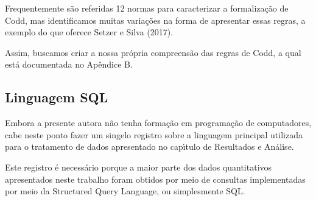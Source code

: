 \documentclass[
12pt,		%
openright,	%
twoside,  %
a4paper,			%
chapter=TITLE,		%
english,			%
french,				%
spanish,			%
brazil				%
]{USPSC-classe/USPSC}
\begin{document}
Frequentemente s\~ao referidas 12 normas para caracterizar a formaliza\c{c}\~ao de Codd, mas identificamos muitas varia\c{c}\~oes na forma de apresentar essas regras, a exemplo do que oferece Setzer e Silva (2017).

















Assim, buscamos criar a nossa pr\'opria compreens\~ao das regras de Codd, a qual est\'a documentada no Ap\^endice B.

















\subsection[Linguagem SQL]{Linguagem SQL}\label{Linguagem SQL}
Embora a presente autora n\~ao tenha forma\c{c}\~ao em programa\c{c}\~ao de computadores, cabe neste ponto fazer um singelo registro sobre a linguagem principal utilizada para o tratamento de dados apresentado no cap\'{\i}tulo de \textquotedbl Resultados e An\'alise\textquotedbl .

















Este registro \'e necess\'ario porque a maior parte dos dados quantitativos apresentados neste trabalho foram obtidos por meio de consultas implementadas por meio da Structured Query Language, ou simplesmente SQL.
\end{document}
